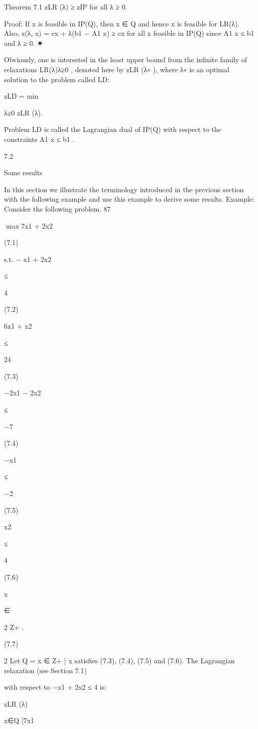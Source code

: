 \documentclass[titlepage]{book}
\theoremstyle{plain}
\theoremstyle{definition}
\theoremstyle{remark}
\begin{document}
Theorem 7.1 zLR (λ) ≥ zIP for all λ ≥ 0.

Proof: If x is feasible in IP(Q), then x ∈ Q and hence x is feasible for LR(λ). Also, z(λ, x) = cx + λ(b1 −
A1 x) ≥ cx for all x feasible in IP(Q) since A1 x ≤ b1 and λ ≥ 0.
✷

Obviously, one is interested in the least upper bound from the infinite family of relaxations {LR(λ)}λ≥0 ,
denoted here by zLR (λ∗ ), where λ∗ is an optimal solution to the problem called LD:

zLD = min

λ≥0 zLR (λ).

Problem LD is called the Lagrangian dual of IP(Q) with respect to the constraints A1 x ≤ b1 .

7.2

Some results

In this section we illustrate the terminology introduced in the previous section with the following example
and use this example to derive some results.
Example: Consider the following problem.
87

max 7x1 + 2x2

(7.1)

s.t. − x1 + 2x2

≤

4

(7.2)

6x1 + x2

≤

24

(7.3)

−2x1 − 2x2

≤

−7

(7.4)

−x1

≤

−2

(7.5)

x2

≤

4

(7.6)

x

∈

2
Z+
.

(7.7)

2
Let Q = {x ∈ Z+
| x satisfies (7.3), (7.4), (7.5) and (7.6)}. The Lagrangian relaxation (see Section 7.1)

with respect to −x1 + 2x2 ≤ 4 is:

zLR (λ)

x∈Q [7x1
\end{document}
